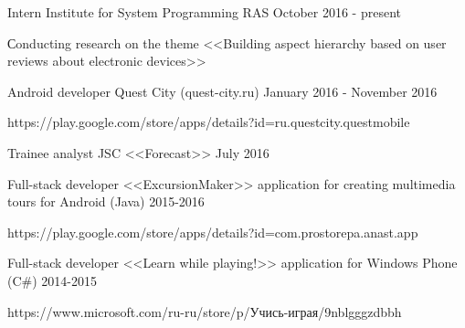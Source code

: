 


\begin{cventries}


\cventry
{Intern} %
{Institute for System Programming RAS} %
{} %
{October 2016 - present} %
{ 
	\begin{cvitems}
		\item {Сonducting research on the theme <<Building aspect hierarchy based on user reviews about electronic devices>>}
	\end{cvitems}
}


\cventry
{Android developer} %
{Quest City (quest-city.ru)} %
{} %
{January 2016 - November 2016} %
{ %
  \begin{cvitems}
\item {https://play.google.com/store/apps/details?id=ru.questcity.questmobile}
 \end{cvitems}
}


\cventry
{Trainee analyst } %
{JSC <<Forecast>>} %
{} %
{July 2016} %
{ %
}


\cventry
{Full-stack developer} %
{<<ExcursionMaker>> application for creating multimedia tours for Android  (Java) } %
{} %
{2015-2016} %
{ %
 \begin{cvitems}
\item {https://play.google.com/store/apps/details?id=com.prostorepa.anast.app}
 \end{cvitems}
}


\cventry
{Full-stack developer} %
{<<Learn while playing!>> application for Windows Phone  (C\#) } %
{} %
{2014-2015} %
{ %
 \begin{cvitems}
\item {https://www.microsoft.com/ru-ru/store/p/Учись-играя/9nblgggzdbbh}
 \end{cvitems}
}

\end{cventries}
